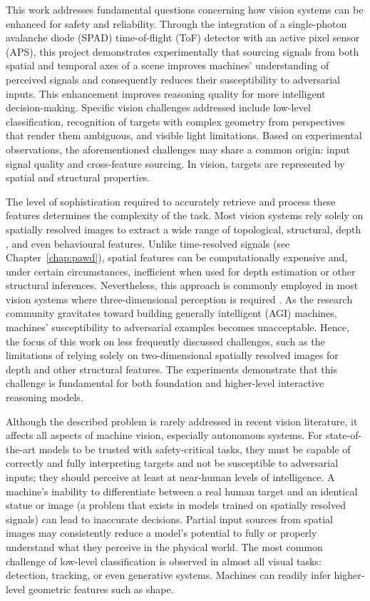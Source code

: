 \documentclass[12pt,a4paper,oneside]{report}
\begin{document}
This work addresses fundamental questions concerning how vision systems can be enhanced for safety and reliability. Through the integration of a single-photon avalanche diode (SPAD) time-of-flight (ToF) detector with an active pixel sensor (APS), this project demonstrates experimentally that sourcing signals from both spatial and temporal axes of a scene improves machines' understanding of perceived signals and consequently reduces their susceptibility to adversarial inputs. This enhancement improves reasoning quality for more intelligent decision-making. Specific vision challenges addressed include low-level classification, recognition of targets with complex geometry from perspectives that render them ambiguous, and visible light limitations. Based on experimental observations, the aforementioned challenges may share a common origin: input signal quality and cross-feature sourcing. In vision, targets are represented by spatial and structural properties.

The level of sophistication required to accurately retrieve and process these features determines the complexity of the task. Most vision systems rely solely on spatially resolved images to extract a wide range of topological, structural, depth \cite{depthpro2024}, and even behavioural features. Unlike time-resolved signals (see Chapter~\ref{chap:pawd}), spatial features can be computationally expensive and, under certain circumstances, inefficient when used for depth estimation \cite{depthpro2024} or other structural inferences. Nevertheless, this approach is commonly employed in most vision systems where three-dimensional perception is required \cite{depthpro2024}. As the research community gravitates toward building generally intelligent (AGI) machines, machines' susceptibility to adversarial examples becomes unacceptable. Hence, the focus of this work on less frequently discussed challenges, such as the limitations of relying solely on two-dimensional spatially resolved images for depth and other structural features. The experiments demonstrate that this challenge is fundamental for both foundation and higher-level interactive reasoning models.

Although the described problem is rarely addressed in recent vision literature, it affects all aspects of machine vision, especially autonomous systems. For state-of-the-art models to be trusted with safety-critical tasks, they must be capable of correctly and fully interpreting targets and not be susceptible to adversarial inputs; they should perceive at least at near-human levels of intelligence. A machine's inability to differentiate between a real human target and an identical statue or image (a problem that exists in models trained on spatially resolved signals) can lead to inaccurate decisions. Partial input sources from spatial images may consistently reduce a model's potential to fully or properly understand what they perceive in the physical world. The most common challenge of low-level classification is observed in almost all visual tasks: detection, tracking, or even generative systems. Machines can readily infer higher-level geometric features such as shape.
\end{document}
